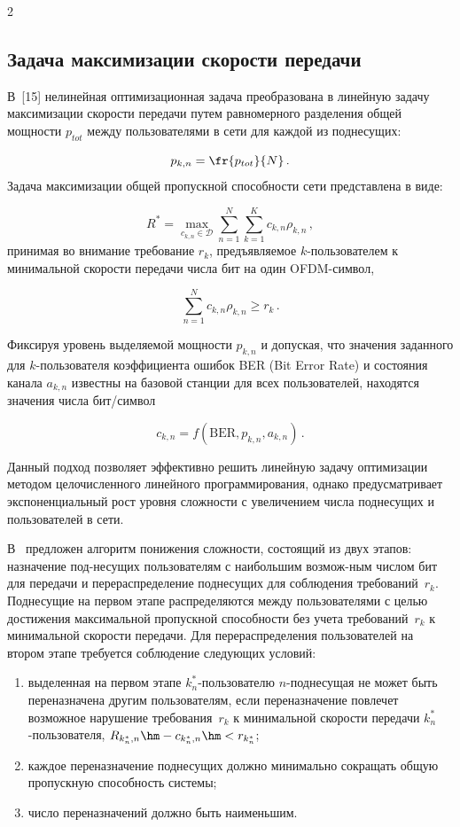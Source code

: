 \begin{multicols}{2}
\subsection{Задача максимизации скорости передачи}

  В~[15] нелинейная оптимизационная задача преобразована в линейную задачу 
максимизации скорости передачи путем равномерного разделения общей мощности 
$p_{tot}$ между пользователями в сети для каждой из поднесущих: 

\noindent
$$
p_{k,n}=\fr{p_{tot}}{N}\,.
$$ 
Задача максимизации общей пропускной способности сети представлена в виде:

\noindent
$$
R^*=\max\limits_{c_{k,n}\in\mathcal{D}} \sum\limits_{n=1}^N \sum\limits_{k=1}^K 
c_{k,n} \rho_{k,n}\,,
$$ 
принимая во внимание требование $r_k$, предъявляемое $k$-поль\-зо\-ва\-те\-лем 
к минимальной ско\-рости передачи чис\-ла бит на один OFDM-сим\-вол, 

\noindent
$$
\sum\limits_{n=1}^N c_{k,n}\rho_{k,n}\geq r_k\,.
$$
  
  Фиксируя уровень выделяемой мощности $p_{k,n}$ и допуская, что значения 
заданного для $k$-поль\-зо\-ва\-те\-ля коэффициента ошибок BER (Bit Error Rate) и состояния 
канала $a_{k,n}$ известны на базовой станции для всех пользователей, находятся 
значения числа бит/символ 

\noindent
$$
c_{k,n}=f(\mathrm{BER}, p_{k,n}, a_{k,n})\,.
$$

Данный подход позволяет 
эффективно решить линейную задачу оптимизации методом це\-ло\-чис\-лен\-но\-го линейного 
программирования, однако предусматривает экспоненциальный рост уровня сложности с 
увеличением числа поднесущих и пользователей в сети.
  
  В~\cite{15-gai} предложен алгоритм понижения слож\-ности, состоящий из двух этапов: 
назначение под-\linebreak несущих пользователям с наибольшим воз\-мож-\linebreak ным числом бит для 
передачи и перераспределение поднесу\-щих для соблюдения требований~$r_k$. 
%
Поднесущие на первом этапе распределяются между пользователями с целью достижения 
максимальной пропускной способности без учета требований~$r_k$ к минимальной 
скорости передачи. 
%
Для перераспределения пользователей на втором этапе требуется 
соблюдение следующих условий:
  \begin{enumerate}[(1)]
\item выделенная на первом этапе $k_n^*$-поль\-зо\-ва\-те\-лю $n$-поднесущая не может 
быть переназначена другим пользователям, если переназначение повлечет возможное 
нарушение требования~$r_k$ к минимальной скорости передачи 
$k_n^*$-поль\-зо\-ва\-те\-ля, $R_{k_n^*,n}\hm-c_{k_n^*,n}\hm<r_{k_n^*}$;
\item каждое переназначение поднесущих должно минимально сокращать общую 
пропускную способность сис\-темы;
\item число переназначений должно быть наименьшим.
\end{enumerate}


\end{multicols}

